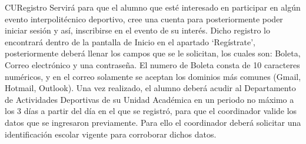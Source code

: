 \begin{UseCase}{CU}{Registro}{
		Servirá para que el alumno que esté interesado en participar en algún evento interpolitécnico deportivo, cree una cuenta para posteriormente poder iniciar sesión y así, inscribirse en el evento de su interés. 
		Dicho registro lo encontrará dentro de la pantalla de Inicio en el apartado ‘Regístrate’, posteriormente deberá llenar los campos que se le solicitan, los cuales son: Boleta, Correo electrónico y una contraseña.
		El numero de Boleta consta de 10 caracteres numéricos, y en el correo solamente se aceptan los dominios más comunes (Gmail, Hotmail, Outlook).
		Una vez realizado, el alumno deberá acudir al Departamento de Actividades Deportivas de su Unidad Académica en un periodo no máximo a los 3 días a partir del día en el que se registró, para que el coordinador valide los datos que se ingresaron previamente. Para ello el coordinador deberá solicitar una identificación escolar vigente para corroborar dichos datos. }
		\label{CU_Registro}
	
\end{UseCase}
